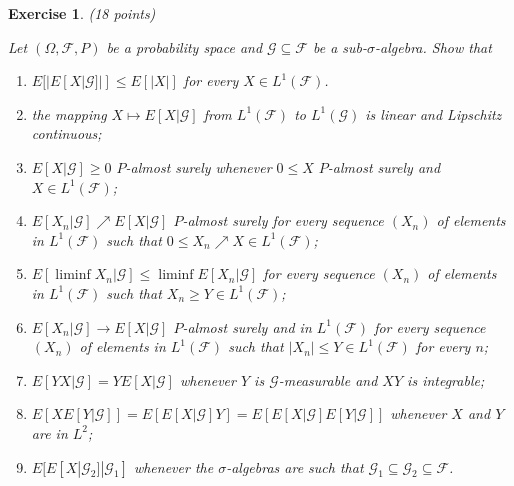 \documentclass[DIV=classic,a4paper,10pt]{scrartcl}
\newtheorem{exercise}[theorem]{Exercise}
\theoremstyle{nonumberplain}
\numberwithin{equation}{section}
\begin{document}
\begin{exercise}(18 points)

    Let $(\Omega,\mathcal{F},P)$ be a probability space and $\mathcal{G}\subseteq \mathcal{F}$ be a sub-$\sigma$-algebra.
    Show that
    \begin{enumerate}[label=\textit{(\roman*)}]
        \item $E[|E[X|\mathcal{G}]|]\leq E[|X|]$ for every $X \in L^1(\mathcal{F})$.
        \item the mapping $X\mapsto E[X | \mathcal{G}]$ from $L^1(\mathcal{F})$ to $L^1(\mathcal{G})$ is linear and Lipschitz continuous;
        \item $E[X|\mathcal{G}]\geq 0$ $P$-almost surely whenever $0\leq X$ $P$-almost surely and $X \in L^1(\mathcal{F})$;
        \item $E[X_n|\mathcal{G}]\nearrow E[X|\mathcal{G}]$ $P$-almost surely for every sequence $(X_n)$ of elements in $L^1(\mathcal{F})$ such that $0\leq X_n\nearrow X\in L^1(\mathcal{F})$;
        \item $E[\liminf X_n |\mathcal{G}]\leq \liminf E[X_n|\mathcal{G}]$ for every sequence $(X_n)$ of elements in $L^1(\mathcal{F})$ such that $X_n\geq Y \in L^1(\mathcal{F})$;
        \item $E[X_n|\mathcal{G}]\to E[X|\mathcal{G}]$ $P$-almost surely and in $L^1(\mathcal{F})$ for every sequence $(X_n)$ of elements in $L^1(\mathcal{F})$ such that $|X_n|\leq Y\in L^1(\mathcal{F})$ for every $n$;
        \item $E[YX|\mathcal{G}]=YE[X|\mathcal{G}]$ whenever $Y$ is $\mathcal{G}$-measurable and $XY$ is integrable;
        \item $E[XE[Y|\mathcal{G}]]=E[E[X|\mathcal{G}]Y]=E[E[X|\mathcal{G}]E[Y|\mathcal{G}]]$ whenever $X$ and $Y$ are in $L^2$;
        \item $E[E[X|\mathcal{G}_2]|\mathcal{G}_1]$ whenever the $\sigma$-algebras are such that $\mathcal{G}_1\subseteq \mathcal{G}_2\subseteq \mathcal{F}$.
    \end{enumerate}
\end{exercise}
\end{document}
